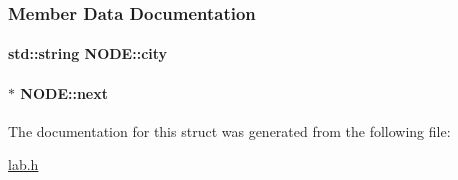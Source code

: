 \subsubsection{Member Data Documentation}
\hypertarget{structNODE_a76c9a9603778b363e65bfe84da4bd72e}{
\paragraph[{city}]{\setlength{\rightskip}{0pt plus 5cm}std\+::string N\+O\+D\+E\+::city}}\label{structNODE_a76c9a9603778b363e65bfe84da4bd72e}
\hypertarget{structNODE_a078472e8ab2d2fe38e052f5c2a425618}{
\paragraph[{next}]{$\ast$ N\+O\+D\+E\+::next}}\label{structNODE_a078472e8ab2d2fe38e052f5c2a425618}


The documentation for this struct was generated from the following file\+:\begin{DoxyCompactItemize}
\item 
\hyperlink{lab_8h}{lab.\+h}\end{DoxyCompactItemize}
